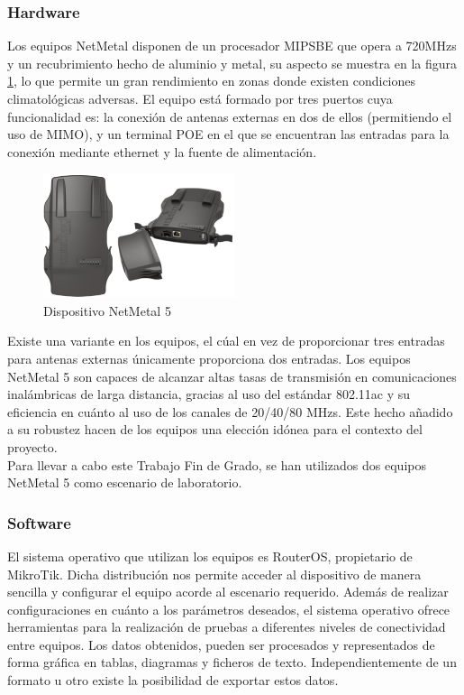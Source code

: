	\subsubsection{Hardware}
	Los equipos NetMetal disponen de un procesador MIPSBE que opera a 720MHzs y un recubrimiento hecho de aluminio y metal, su aspecto se muestra en la figura \ref{equipo}, lo que permite un gran rendimiento en zonas donde existen condiciones climatológicas adversas. El equipo está formado por tres puertos cuya funcionalidad es: la conexión de antenas externas en dos de ellos (permitiendo el uso de MIMO), y un terminal POE en el que se encuentran las entradas para la conexión mediante ethernet y la fuente de alimentación.
	\begin{figure}[H]
		\centering
		\includegraphics[width=0.5\textwidth]{img/netMetal5.png}
		\caption{Dispositivo NetMetal 5}
		\label{equipo}
	\end{figure}
	Existe una variante en los equipos, el cúal en vez de proporcionar tres entradas para antenas externas únicamente proporciona dos entradas.
	Los equipos NetMetal 5 son capaces de alcanzar altas tasas de transmisión en comunicaciones inalámbricas de larga distancia, gracias al uso del estándar 802.11ac y su eficiencia en cuánto al uso de los canales de 20/40/80 MHzs. Este hecho añadido a su robustez hacen de los equipos una elección idónea para el contexto del proyecto.\\
	Para llevar a cabo este Trabajo Fin de Grado, se han utilizados dos equipos NetMetal 5 como escenario de laboratorio.
	\subsubsection{Software}
	El sistema operativo que utilizan los equipos es RouterOS, propietario de MikroTik. Dicha distribución nos permite acceder al dispositivo de manera sencilla y configurar el equipo acorde al escenario requerido. Además de realizar configuraciones en cuánto a los parámetros deseados, el sistema operativo ofrece herramientas para la realización de pruebas a diferentes niveles de conectividad entre equipos. Los datos obtenidos, pueden ser procesados y representados de forma gráfica en tablas, diagramas y ficheros de texto. Independientemente de un formato u otro existe la posibilidad de exportar estos datos.\\\\
	
